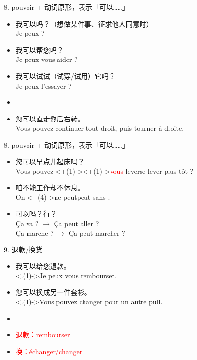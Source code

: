 \documentclass[french, aspectratio=169, 14pt, handout]{beamer}
\newcommand{\red}[1]{\textcolor{red}{#1}} %
\begin{document}
\begin{CJK*}{UTF8}{gkai}
\begin{frame}{8. pouvoir + 动词原形，表示「可以……」}
\begin{itemize}
	\item 我可以吗？（想做某件事、征求他人同意时） \pause \\ Je peux ? \pause
	\item 我可以帮您吗？ \pause \\ Je peux \pause vous aider ? \pause
	\item 我可以试试（试穿/试用）它吗？ \pause \\ Je peux \pause l’essayer ? \pause
	\item[]
	\item 您可以直走然后右转。 \pause \\ Vous pouvez \pause continuer tout droit, puis \pause tourner à droite.
\end{itemize}
\end{frame}

\begin{frame}{8. pouvoir + 动词原形，表示「可以……」}
\begin{itemize}
	\item 您可以早点儿起床吗？ \\ Vous pouvez \visible<+(1)->{\alt<+(1)->{\red{vous} lever}{se lever}} plus tôt ?  \pause
	\item 咱不能工作却不休息。	\pause \\ On \alt<+(4)->{ne peut}{peut} \visible<+->{\red{pas}}  sans . \pause
	\item 可以吗？行？ \\
	Ça va ?  $\rightarrow$  \pause Ça peut aller ? \pause \\
	Ça marche ? $\rightarrow$ \pause Ça peut marcher ? 
\end{itemize}
\end{frame}

\begin{frame}{9. 退款/换货}
\begin{itemize}
	\item \alert<+>{我可以}给您退款。 \\ \visible<.(1)->{Je peux} vous rembourser.  \pause
	\item \alert<+>{您可以}换成另一件套衫。 \\ \visible<.(1)->{Vous pouvez} changer pour un autre pull.  \pause
	\item[]
	\item \red{退款：rembourser} \pause \\
	\item \red{换：échanger/changer}
\end{itemize}
\end{frame}


\end{CJK*}
\end{document}

